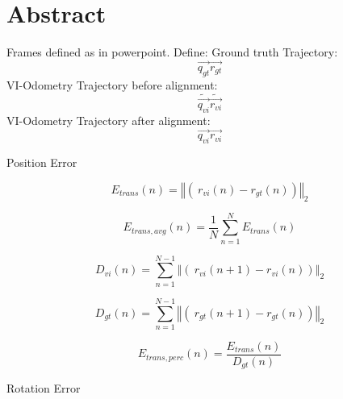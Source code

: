 \chapter*{Abstract}

Frames defined as in powerpoint.
Define:
Ground truth Trajectory: 
\begin{equation}
       \vec{q_{gt}} \vec{r_{gt}}
\end{equation}
VI-Odometry Trajectory before alignment:
\begin{equation}
       \tilde{\vec{q_{vi}}} \tilde{\vec{r_{vi}}}
\end{equation}
VI-Odometry Trajectory after alignment:
\begin{equation}
       \vec{q_{vi}} \vec{r_{vi}}
\end{equation}

Position Error

\begin{equation}
       E_{trans} \left( n \right) = \left\Vert\left(\ r_{vi} \left( n \right) - r_{gt} \left( n \right) \right) \right\Vert_2
\end{equation}

\begin{equation}
       E_{trans, avg} \left( n \right) = \frac{1}{N} \sum_{n=1}^N E_{trans} \left( n \right)
\end{equation}

\begin{equation}
       D_{vi} \left( n \right) = \sum_{n=1}^{N-1} \left\Vert\left(\ r_{vi} \left( n+1 \right) - r_{vi} \left( n \right) \right) \right\Vert_2
\end{equation}

\begin{equation}
       D_{gt} \left( n \right) = \sum_{n=1}^{N-1} \left\Vert\left(\ r_{gt} \left( n+1 \right) - r_{gt} \left( n \right) \right) \right\Vert_2
\end{equation}

\begin{equation}
       E_{trans, perc} \left( n \right) = \frac{E_{trans} \left( n \right)}{D_{gt} \left( n \right)}
\end{equation}

Rotation Error

